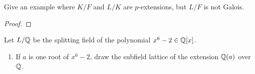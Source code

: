 \begin{problem}
Give an example where $K/F$ and $L/K$ are $p$-extensions, but $L/F$ is not
Galois.
\end{problem}
\begin{proof}
\end{proof}

\begin{problem}
Let $L/\mathbb{Q}$ be the splitting field of the polynomial $x^6-2\in\mathbb{Q}[x]$.
\begin{enumerate}[label=(\alph*)]
\item If $a$ is one root of $x^6-2$, draw the subfield lattice of the
  extension $\mathbb{Q}(a)$ over $\mathbb{Q}$.


\end{enumerate}
\end{problem}
